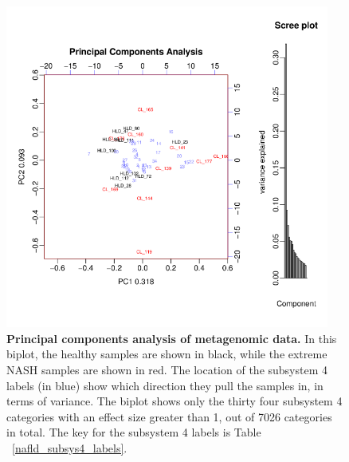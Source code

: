 \begin{figure}[h]
\begin{center}
\includegraphics[width=0.95\textwidth]{metagenomic_pca.png}
\caption[Principal components analysis of metagenomic data.]{\textbf{Principal components analysis of metagenomic data.} In this biplot, the healthy samples are shown in black, while the extreme NASH samples are shown in red. The location of the subsystem 4 labels (in blue) show which direction they pull the samples in, in terms of variance. The biplot shows only the thirty four subsystem 4 categories with an effect size greater than 1, out of 7026 categories in total. The key for the subsystem 4 labels is Table ~\ref{nafld_subsys4_labels}.}
\label{nafld_metagenomic_pca}
\end{center}
\end{figure}

